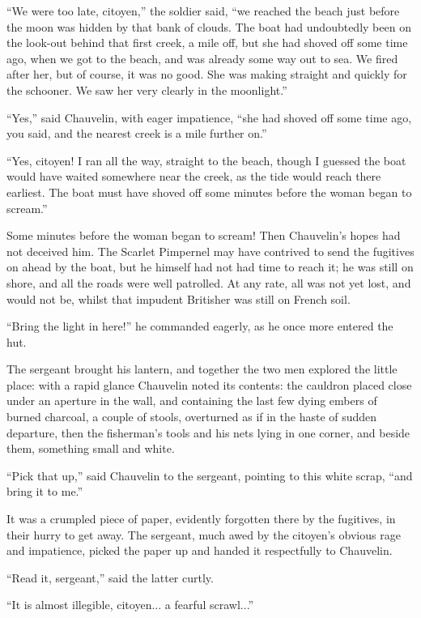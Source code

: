 \enquote{We were too late, citoyen,} the soldier said, \enquote{we reached the beach just before the moon was hidden by that bank of clouds. The boat had undoubtedly been on the look-out behind that first creek, a mile off, but she had shoved off some time ago, when we got to the beach, and was already some way out to sea. We fired after her, but of course, it was no good. She was making straight and quickly for the schooner. We saw her very clearly in the moonlight.}

\enquote{Yes,} said Chauvelin, with eager impatience, \enquote{she had shoved off some time ago, you said, and the nearest creek is a mile further on.}

\enquote{Yes, citoyen! I ran all the way, straight to the beach, though I guessed the boat would have waited somewhere near the creek, as the tide would reach there earliest. The boat must have shoved off some minutes before the woman began to scream.}

Some minutes before the woman began to scream! Then Chauvelin's hopes had not deceived him. The Scarlet Pimpernel may have contrived to send the fugitives on ahead by the boat, but he himself had not had time to reach it; he was still on shore, and all the roads were well patrolled. At any rate, all was not yet lost, and would not be, whilst that impudent Britisher was still on French soil.

\enquote{Bring the light in here!} he commanded eagerly, as he once more entered the hut.

The sergeant brought his lantern, and together the two men explored the little place: with a rapid glance Chauvelin noted its contents: the cauldron placed close under an aperture in the wall, and containing the last few dying embers of burned charcoal, a couple of stools, overturned as if in the haste of sudden departure, then the fisherman's tools and his nets lying in one corner, and beside them, something small and white.

\enquote{Pick that up,} said Chauvelin to the sergeant, pointing to this white scrap, \enquote{and bring it to me.}

It was a crumpled piece of paper, evidently forgotten there by the fugitives, in their hurry to get away. The sergeant, much awed by the citoyen's obvious rage and impatience, picked the paper up and handed it respectfully to Chauvelin.

\enquote{Read it, sergeant,} said the latter curtly.

\enquote{It is almost illegible, citoyen... a fearful scrawl...}

